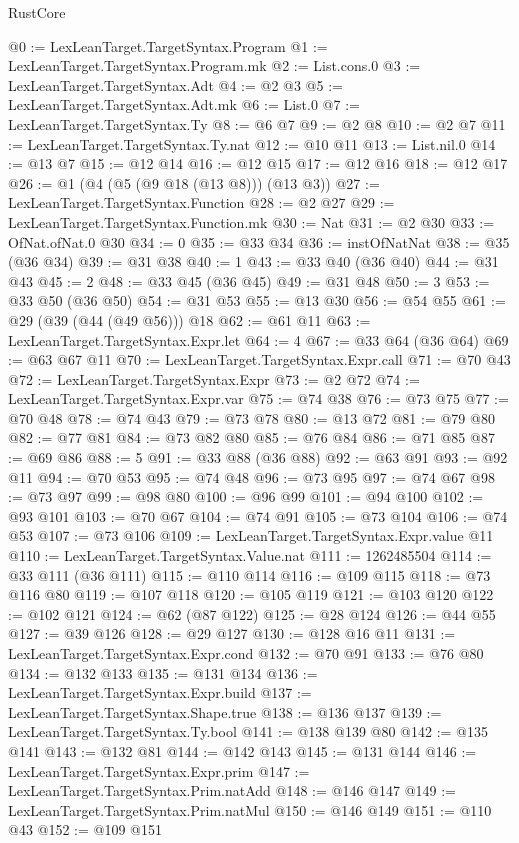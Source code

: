 \begin{lexlean}{RustCore}
\begin{coremodule}
@0 := LexLeanTarget.TargetSyntax.Program
@1 := LexLeanTarget.TargetSyntax.Program.mk
@2 := List.cons.{0}
@3 := LexLeanTarget.TargetSyntax.Adt
@4 := @2 @3
@5 := LexLeanTarget.TargetSyntax.Adt.mk
@6 := List.{0}
@7 := LexLeanTarget.TargetSyntax.Ty
@8 := @6 @7
@9 := @2 @8
@10 := @2 @7
@11 := LexLeanTarget.TargetSyntax.Ty.nat
@12 := @10 @11
@13 := List.nil.{0}
@14 := @13 @7
@15 := @12 @14
@16 := @12 @15
@17 := @12 @16
@18 := @12 @17
@26 := @1 (@4 (@5 (@9 @18 (@13 @8))) (@13 @3))
@27 := LexLeanTarget.TargetSyntax.Function
@28 := @2 @27
@29 := LexLeanTarget.TargetSyntax.Function.mk
@30 := Nat
@31 := @2 @30
@33 := OfNat.ofNat.{0} @30
@34 := 0
@35 := @33 @34
@36 := instOfNatNat
@38 := @35 (@36 @34)
@39 := @31 @38
@40 := 1
@43 := @33 @40 (@36 @40)
@44 := @31 @43
@45 := 2
@48 := @33 @45 (@36 @45)
@49 := @31 @48
@50 := 3
@53 := @33 @50 (@36 @50)
@54 := @31 @53
@55 := @13 @30
@56 := @54 @55
@61 := @29 (@39 (@44 (@49 @56))) @18
@62 := @61 @11
@63 := LexLeanTarget.TargetSyntax.Expr.let
@64 := 4
@67 := @33 @64 (@36 @64)
@69 := @63 @67 @11
@70 := LexLeanTarget.TargetSyntax.Expr.call
@71 := @70 @43
@72 := LexLeanTarget.TargetSyntax.Expr
@73 := @2 @72
@74 := LexLeanTarget.TargetSyntax.Expr.var
@75 := @74 @38
@76 := @73 @75
@77 := @70 @48
@78 := @74 @43
@79 := @73 @78
@80 := @13 @72
@81 := @79 @80
@82 := @77 @81
@84 := @73 @82 @80
@85 := @76 @84
@86 := @71 @85
@87 := @69 @86
@88 := 5
@91 := @33 @88 (@36 @88)
@92 := @63 @91
@93 := @92 @11
@94 := @70 @53
@95 := @74 @48
@96 := @73 @95
@97 := @74 @67
@98 := @73 @97
@99 := @98 @80
@100 := @96 @99
@101 := @94 @100
@102 := @93 @101
@103 := @70 @67
@104 := @74 @91
@105 := @73 @104
@106 := @74 @53
@107 := @73 @106
@109 := LexLeanTarget.TargetSyntax.Expr.value @11
@110 := LexLeanTarget.TargetSyntax.Value.nat
@111 := 1262485504
@114 := @33 @111 (@36 @111)
@115 := @110 @114
@116 := @109 @115
@118 := @73 @116 @80
@119 := @107 @118
@120 := @105 @119
@121 := @103 @120
@122 := @102 @121
@124 := @62 (@87 @122)
@125 := @28 @124
@126 := @44 @55
@127 := @39 @126
@128 := @29 @127
@130 := @128 @16 @11
@131 := LexLeanTarget.TargetSyntax.Expr.cond
@132 := @70 @91
@133 := @76 @80
@134 := @132 @133
@135 := @131 @134
@136 := LexLeanTarget.TargetSyntax.Expr.build
@137 := LexLeanTarget.TargetSyntax.Shape.true
@138 := @136 @137
@139 := LexLeanTarget.TargetSyntax.Ty.bool
@141 := @138 @139 @80
@142 := @135 @141
@143 := @132 @81
@144 := @142 @143
@145 := @131 @144
@146 := LexLeanTarget.TargetSyntax.Expr.prim
@147 := LexLeanTarget.TargetSyntax.Prim.natAdd
@148 := @146 @147
@149 := LexLeanTarget.TargetSyntax.Prim.natMul
@150 := @146 @149
@151 := @110 @43
@152 := @109 @151

\end{coremodule}
\end{lexlean}
